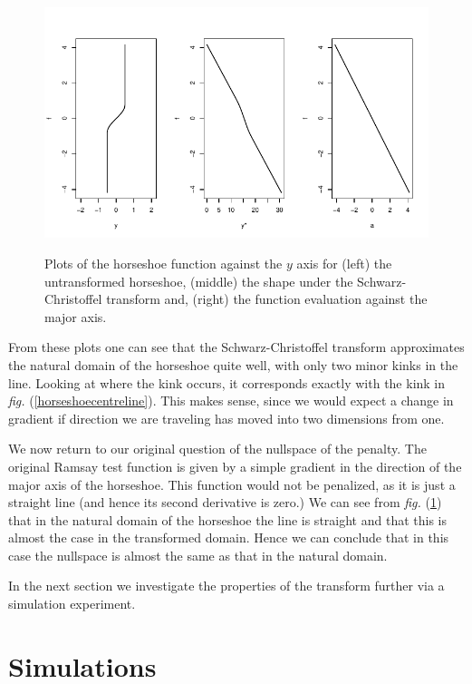 \documentclass[a4paper,10pt]{amsart}
\newcommand{\sch}{Schwarz-Christoffel }
\newcommand{\fig}[1]{\emph{fig.} (\ref{#1})}
\begin{document}
\begin{figure}
\centering
\includegraphics[trim=0in 0in 0in 0in]{figs/centrelinelineplots.pdf} \\
\caption{Plots of the horseshoe function against the $y$ axis for (left) the untransformed horseshoe, (middle) the shape under the \sch transform and, (right) the function evaluation against the major axis.}
\label{centrelinelineplot}
\end{figure}

From these plots one can see that the \sch transform approximates the natural domain of the horseshoe quite well, with only two minor kinks in the line. Looking at where the kink occurs, it corresponds exactly with the kink in \fig{horseshoecentreline}. This makes sense, since we would expect a change in gradient if direction we are traveling has moved into two dimensions from one.

We now return to our original question of the nullspace of the penalty. The original Ramsay test function is given by a simple gradient in the direction of the major axis of the horseshoe. This function would not be penalized, as it is just a straight line (and hence its second derivative is zero.) We can see from \fig{centrelinelineplot} that in the natural domain of the horseshoe the line is straight and that this is almost the case in the transformed domain. Hence we can conclude that in this case the nullspace is almost the same as that in the natural domain.

In the next section we investigate the properties of the transform further via a simulation experiment.

\section{Simulations}
\end{document}
